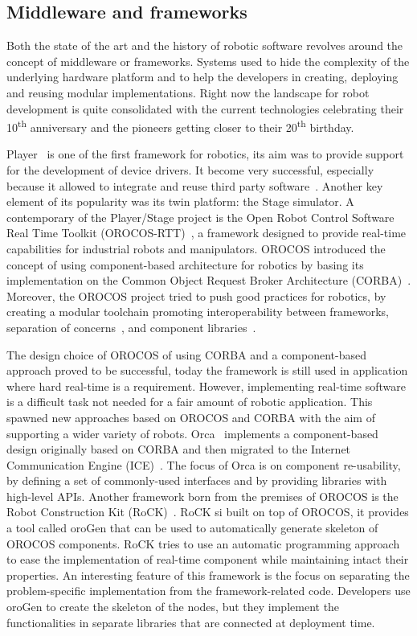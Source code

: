 \subsection{Middleware and frameworks}
Both the state of the art and the history of robotic software revolves around the concept of middleware or frameworks. Systems used to hide the complexity of the underlying hardware platform and to help the developers in creating, deploying and reusing modular implementations. Right now the landscape for robot development is quite consolidated with the current technologies celebrating their 10\textsuperscript{th} anniversary and the pioneers getting closer to their 20\textsuperscript{th} birthday.

Player~\cite{gerkey2003player} is one of the first framework for robotics, its aim was to provide support for the development of device drivers. It become very successful, especially because it allowed to integrate and reuse third party software~\cite{vaughan2007reusable}. Another key element of its popularity was its twin platform: the Stage simulator. A contemporary of the Player/Stage project is the Open Robot Control Software Real Time Toolkit (OROCOS-RTT)~\cite{bruyninckx2001open}, a framework designed to provide real-time capabilities for industrial robots and manipulators. OROCOS introduced the concept of using component-based architecture for robotics by basing its implementation on the Common Object Request Broker Architecture (CORBA)~\cite{otte1996understanding}. Moreover, the OROCOS project tried to push good practices for robotics, by creating a modular toolchain promoting interoperability between frameworks, separation of concerns~\cite{bruyninckx2003real}, and component libraries~\cite{bruyninckx2002orocos}.

The design choice of OROCOS of using CORBA and a component-based approach proved to be successful, today the framework is still used in application where hard real-time is a requirement. However, implementing real-time software is a difficult task not needed for a fair amount of robotic application. This spawned new approaches based on OROCOS and CORBA with the aim of supporting a wider variety of robots. Orca~\cite{brooks2007orca} implements a component-based design originally based on CORBA and then migrated to the Internet Communication Engine (ICE)~\cite{ICE}. The focus of Orca is on component re-usability, by defining a set of commonly-used interfaces and by providing libraries with high-level APIs. Another framework born from the premises of OROCOS is the Robot Construction Kit (RoCK)~\cite{joyeux2011robot}. RoCK si built on top of OROCOS, it provides a tool called oroGen that can be used to automatically generate skeleton of OROCOS components. RoCK tries to use an automatic programming approach to ease the implementation of real-time component while maintaining intact their properties. An interesting feature of this framework is the focus on separating the problem-specific implementation from the framework-related code. Developers use oroGen to create the skeleton of the nodes, but they implement the functionalities in separate libraries that are connected at deployment time.


